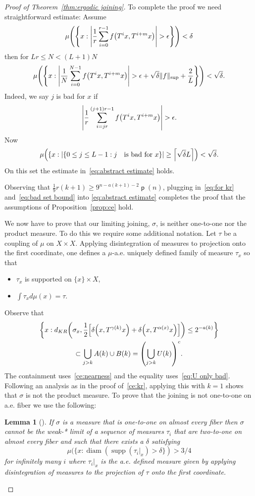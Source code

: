 \documentclass[10pt]{amsart}
\newtheorem{lemm}[theo]{Lemma}\newtheorem{prop}[theo]{Proposition}\newtheorem{coro}[theo]{Corollary}\newtheorem{conj}[theo]{Conjecture}
\theoremstyle{definition}\newtheorem{defi}[theo]{Definition}\newtheorem{rema}[theo]{Remark}\newtheorem{exam}[theo]{Example}\newtheorem{exem}[theo]{Example}\newtheorem{nota}[theo]{Notation}
\DeclareMathOperator{\p}{\mathsf{p}}
\DeclareMathOperator{\supp}{supp}
\DeclareMathOperator{\diam}{diam}
\let\originalleft\left
\let\originalright\right
\renewcommand{\left}{\mathopen{}\mathclose\bgroup\originalleft}
\renewcommand{\right}{\aftergroup\egroup\originalright}
\begin{document}
\begin{proof}[Proof of Theorem~\ref{thm:ergodic joining}]
To complete the proof we need straightforward estimate:
Assume
\[
\mu \left(\left\{ x: \left| \frac 1 r \sum_{i=0}^{r-1}f\left(T^ix,T^{i+m}x\right) \right| >\epsilon \right\} \right)<\delta
\]
then for $Lr\leq N<(L+1)N$
\begin{equation}\label{eq:abstract estimate}
\mu \left(\left\{ x : \left| \frac 1 N \sum_{i=0}^{N-1}f\left(T^ix,T^{i+m}x\right) \right| >\epsilon+\sqrt{\delta}\|f\|_{\sup}+\frac 2 {L} \right\} \right) < \sqrt{\delta}.
\end{equation}
Indeed, we say $j$ is bad for $x$ if
\[
\left| \frac 1 r \sum_{i=jr}^{(j+1)r-1}f\left(T^ix,T^{i+m}x\right) \right| >\epsilon.
\]
Now
\[
\mu\left(
\{x: |\{0\leq j\leq L-1:j \quad\text{is bad for }x\}|\geq \left\lceil \sqrt{\delta}L\right\rceil \right)<\sqrt{\delta}.
\]
On this set the estimate in~\eqref{eq:abstract estimate} holds.

Observing that $\frac 1 9 r(k+1)\geq 9^{n-a(k+1)-2} \p(n)$, plugging in~\eqref{eq:for kr} and~\eqref{eq:bad set bound} into \eqref{eq:abstract estimate} completes the proof that the assumptions of Proposition~\ref{prop:ce} hold.


We now have to prove that our limiting joining, $\sigma$, is neither one-to-one nor the product measure. To do this we require some additional notation. Let $\tau$ be a coupling of $\mu$ on $X \times X$. Applying disintegration of measures to projection onto the first coordinate, one defines a $\mu$-a.e. uniquely defined family of measure $\tau_x$ so that
\begin{itemize}
\item $\tau_x$ is supported on $\{x\} \times X$,
\item $\int \tau_xd\mu(x)=\tau$.
\end{itemize}
Observe that
\begin{multline}\label{eq:disintegration understood}
\left\{x:d_{KR}\left(\sigma_x, \frac 1 2 \left[\delta\left(x,T^{\gamma(k)}x\right)+\delta\left(x,T^{\alpha(x)}x\right)\right]\right)\leq 2^{-a(k)} \right\}\\
\subset \bigcup_{j>k}A(k) \cup B(k)= \left(\bigcup_{j>k}U(k)\right)^c.
\end{multline}
The containment uses~\eqref{ce:nearness} and the equality uses~\eqref{eq:U only bad}. Following an analysis as in the proof of~\eqref{ce:kr}, applying this with $k=1$ shows that $\sigma$ is not the product measure. To prove that the joining is not one-to-one on a.e. fiber we use the following:

\begin{lemm}[{\cite[Lemma~4.7]{MR4269425}}]
If $\sigma$ is a measure that is one-to-one on almost every fiber then $\sigma$ cannot be the weak-* limit of a sequence of measures $\tau_i$ that are two-to-one on almost every fiber and such that there exists a $\delta$ satisfying
\[
\mu(\{x : \diam(\supp(\tau_i|_x) > \delta\}) > 3/4
\]
for infinitely many $i$ where $\tau_i|_x$ is the a.e. defined measure given by applying disintegration of measures to the projection of $\tau$ onto the first coordinate.
\end{lemm}


\end{proof}
\end{document}
